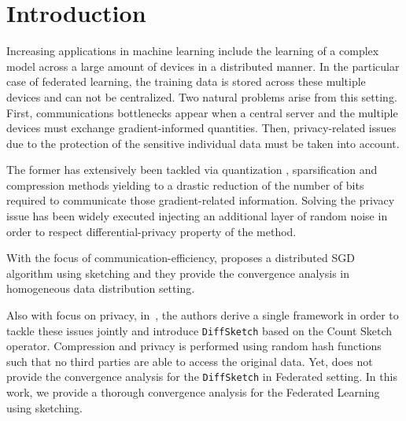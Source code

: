\section{Introduction}
Increasing applications in machine learning include the learning of a complex model across a large amount of devices in a distributed manner.
In the particular case of federated learning, the training data is stored across these multiple devices and can not be centralized.
Two natural problems arise from this setting. 
First, communications bottlenecks appear when a central server and the multiple devices must exchange gradient-informed quantities.
Then, privacy-related issues due to the protection of the sensitive individual data must be taken into account.

The former has extensively been tackled via quantization \cite{alistarh2017qsgd}, sparsification \cite{wangni2018gradient} and compression \cite{bernstein2018signsgd} methods yielding to a drastic reduction of the number of bits required to communicate those gradient-related information.
Solving the privacy issue has been widely executed injecting an additional layer of random noise in order to respect differential-privacy property of the method.


With the focus of communication-efficiency, \cite{ivkin2019communication} proposes a distributed SGD algorithm using sketching and they provide the convergence analysis in homogeneous data distribution setting. 

Also with focus on privacy,  in~\cite{li2019privacy}, the authors derive a single framework in order to tackle these issues jointly and introduce \texttt{DiffSketch} based on the Count Sketch operator. Compression and privacy is performed using random hash functions such that no third parties are able to access the original data. Yet, \cite{li2019privacy} does not provide the convergence analysis for the \texttt{DiffSketch} in Federated setting. In this work, we provide a thorough convergence analysis for the Federated Learning using sketching.

